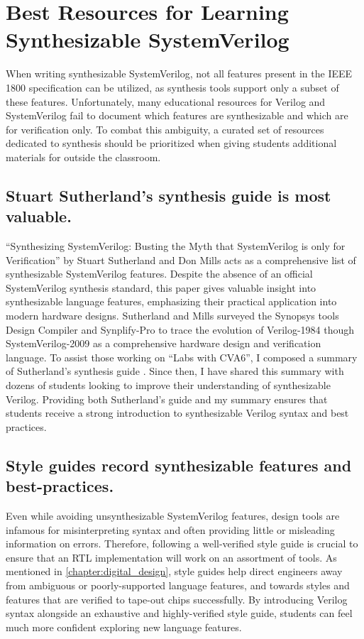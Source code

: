 
\chapter{Best Resources for Learning Synthesizable SystemVerilog}
\label{chapter:resources}

When writing synthesizable SystemVerilog, not all features present in the IEEE 1800 specification can be utilized, as synthesis tools support only a subset of these features. Unfortunately, many educational resources for Verilog and SystemVerilog fail to document which features are synthesizable and which are for verification only. To combat this ambiguity, a curated set of resources dedicated to synthesis should be prioritized when giving students additional materials for outside the classroom.

\section{Stuart Sutherland's synthesis guide is most valuable.}

``Synthesizing SystemVerilog: Busting the Myth that SystemVerilog is only for Verification'' by Stuart Sutherland and Don Mills acts as a comprehensive list of synthesizable SystemVerilog features. Despite the absence of an official SystemVerilog synthesis standard, this paper gives valuable insight into synthesizable language features, emphasizing their practical application into modern hardware designs. Sutherland and Mills surveyed the Synopsys tools Design Compiler and Synplify-Pro to trace the evolution of Verilog-1984 though SystemVerilog-2009 as a comprehensive hardware design and verification language. To assist those working on ``Labs with CVA6'', I composed a summary of Sutherland's synthesis guide \cite{labsWithCVA6}. Since then, I have shared this summary with dozens of students looking to improve their understanding of synthesizable Verilog. Providing both Sutherland's guide and my summary ensures that students receive a strong introduction to synthesizable Verilog syntax and best practices.

\section{Style guides record synthesizable features and best-practices.}

Even while avoiding unsynthesizable SystemVerilog features, design tools are infamous for misinterpreting syntax and often providing little or misleading information on errors. Therefore, following a well-verified style guide is crucial to ensure that an RTL implementation will work on an assortment of tools. As mentioned in \autoref{chapter:digital_design}, style guides help direct engineers away from ambiguous or poorly-supported language features, and towards styles and features that are verified to tape-out chips successfully. By introducing Verilog syntax alongside an exhaustive and highly-verified style guide, students can feel much more confident exploring new language features.


